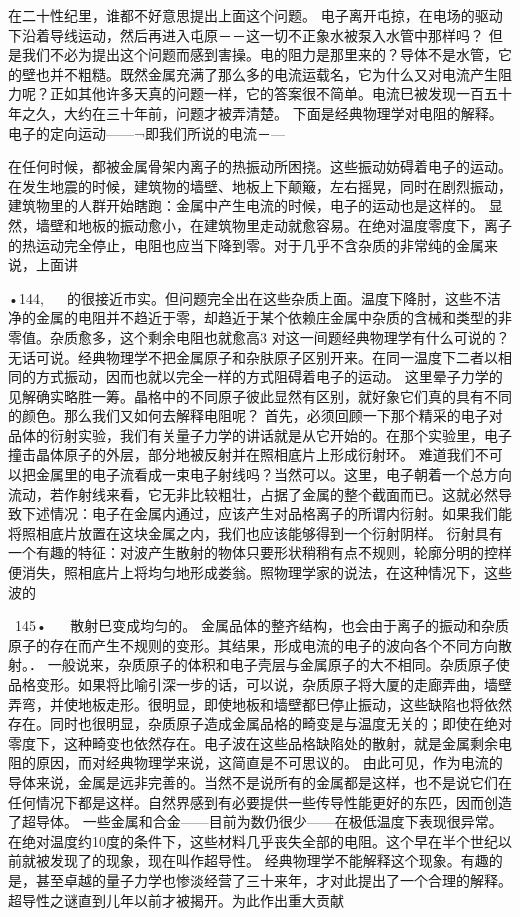 在二十性纪里，谁都不好意思提出上面这个问题。
电子离开屯掠，在电场的驱动下沿着导线运动，然后再进入屯原－－这一切不正象水被泵入水管中那样吗？
但是我们不必为提出这个问题而感到害操。电的阻力是那里来的？导体不是水管，它的壁也并不粗糙。既然金属充满了那么多的电流运载名，它为什么又对电流产生阻力呢？正如其他许多天真的问题一样，它的答案很不简单。电流巳被发现一百五十年之久，大约在三十年前，问题才被弄清楚。
下面是经典物理学对电阻的解释。电子的定向运动——¬即我们所说的电流－—{在任何时候，都被金属骨架内离子的热振动所困挠。这些振动妨碍着电子的运动。在发生地震的时候，建筑物的墙壁、地板上下颠簸，左右摇晃，同时在剧烈振动，建筑物里的人群开始瞎跑：金属中产生电流的时候，电子的运动也是这样的。
显然，墙壁和地板的振动愈小，在建筑物里走动就愈容易。在绝对温度零度下，离子的热运动完全停止，电阻也应当下降到零。对于几乎不含杂质的非常纯的金属来说，上面讲

•144,
  
的很接近市实。但问题完全出在这些杂质上面。温度下降肘，这些不洁净的金属的电阻并不趋近于零，却趋近于某个依赖庄金属中杂质的含械和类型的非零值。杂质愈多，这个剩余电阻也就愈高3
对这一间题经典物理学有什么可说的？无话可说。经典物理学不把金属原子和杂肤原子区别开来。在同一温度下二者以相同的方式振动，因而也就以完全一样的方式阻碍着电子的运动。
这里晕子力学的见解确实略胜一筹。晶格中的不同原子彼此显然有区别，就好象它们真的具有不同的颜色。那么我们又如何去解释电阻呢？
首先，必须回顾一下那个精采的电子对品体的衍射实验，我们有关量子力学的讲话就是从它开始的。在那个实验里，电子撞击晶体原子的外层，部分地被反射并在照相底片上形成衍射环。
难道我们不可以把金属里的电子流看成一束电子射线吗？当然可以。这里，电子朝着一个总方向流动，若作射线来看，它无非比较粗壮，占据了金属的整个截面而已。这就必然导致下述情况：电子在金属内通过，应该产生对品格离子的所谓内衍射。如果我们能将照相底片放置在这块金属之内，我们也应该能够得到一个衍射阴样。
衍射具有一个有趣的特征：对波产生散射的物体只要形状稍稍有点不规则，轮廓分明的控样便消失，照相底片上将均匀地形成娄翁。照物理学家的说法，在这种情况下，这些波的

~145•
  
散射巳变成均匀的。
金属品体的整齐结构，也会由于离子的振动和杂质原子的存在而产生不规则的变形。其结果，形成电流的电子的波向各个不同方向散射。．
一般说来，杂质原子的体积和电子壳层与金属原子的大不相同。杂质原子使品格变形。如果将比喻引深一步的话，可以说，杂质原子将大厦的走廊弄曲，墙壁弄弯，并使地板走形。很明显，即使地板和墙壁都巳停止振动，这些缺陷也将依然存在。同时也很明显，杂质原子造成金属品格的畸变是与温度无关的；即使在绝对零度下，这种畸变也依然存在。电子波在这些品格缺陷处的散射，就是金属剩余电阻的原因，而对经典物理学来说，这简直是不可思议的。
由此可见，作为电流的导体来说，金属是远非完善的。当然不是说所有的金属都是这样，也不是说它们在任何情况下都是这样。自然界感到有必要提供一些传导性能更好的东匹，因而创造了超导体。
一些金属和合金——目前为数仍很少——在极低温度下表现很异常。在绝对温度约10度的条件下，这些材料几乎丧失全部的电阻。这个早在半个世纪以前就被发现了的现象，现在叫作超导性。
经典物理学不能解释这个现象。有趣的是，甚至卓越的量子力学也惨淡经营了三十来年，才对此提出了一个合理的解释。
超导性之谜直到儿年以前才被揭开。为此作出重大贡献

}
